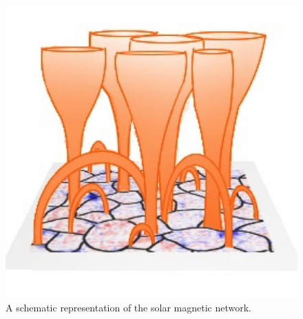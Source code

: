 \documentclass[physics,article,submit,pdftex,moreauthors]{Definitions/mdpi}
\begin{document}


\begin{figure}[h]\label{magneticnetwork}
\centering
\includegraphics[scale=0.3]{solar-network-v1.jpg}
\caption{A schematic representation of the solar magnetic network. 
}
\end{figure}
\end{document}
